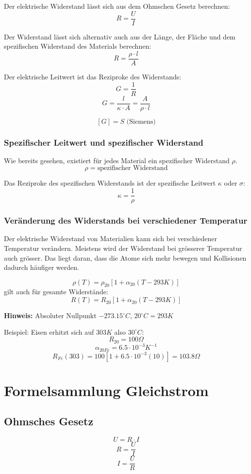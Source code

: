 \documentclass[a4paper,12pt]{article}
\begin{document}
    Der elektrische Widerstand lässt sich aus dem Ohmschen Gesetz berechnen:
    $$R = \frac{U}{I}$$
    
    Der Widerstand lässt sich alternativ auch aus der Länge, der Fläche und dem spezifischen Widerstand des Materials berechnen:
    $$R = \frac{\rho \cdot l}{A}$$
    
    Der elektrische Leitwert ist das Reziproke des Widerstands:
    $$G = \frac{1}{R}$$
    $$G = \frac{l}{\kappa \cdot A} = \frac{A}{\rho \cdot l}$$
    
    $$[G] = S \text{ (Siemens)}$$
    
    \subsubsection{Spezifischer Leitwert und spezifischer Widerstand}
    Wie bereits gesehen, existiert für jedes Material ein spezifischer Widerstand $\rho$.
    $$\rho = \text{spezifischer Widerstand}$$
    
    Das Reziproke des spezifischen Widerstands ist der spezifische Leitwert $\kappa$ oder $\sigma$:
    $$\kappa = \frac{1}{\rho}$$
    
    \subsubsection{Veränderung des Widerstands bei verschiedener Temperatur}
    Der elektrische Widerstand von Materialien kann sich bei verschiedener Temperatur verändern. Meistens wird der Widerstand bei grösserer Temperatur auch grösser. Das liegt daran, dass die Atome sich mehr bewegen und Kollisionen dadurch häufiger werden.
    
    $$\rho(T)=\rho_{20}[1+\alpha_{20}(T-293K)]$$
    gilt auch für gesamte Widerstände:
    $$R(T)=R_{20}[1+\alpha_{20}(T-293K)]$$
    
    \textbf{Hinweis:} Absoluter Nullpunkt $-273.15^\circ C$, $20^\circ C = 293K$
    
    Beispiel:  
    Eisen erhitzt sich auf $303K$ also $30^\circ C$:
    $$R_{20} = 100 \Omega$$
    $$\alpha_{20Fe}=6.5\cdot 10^{-3}K^{-1}$$
    $$R_{Fe}(303)=100[1+6.5\cdot10^{-3}(10)] = 103.8 \Omega$$
    
    \section{Formelsammlung Gleichstrom}
    
    \subsection{Ohmsches Gesetz}
    $$U=R\cdot I$$
    $$R=\frac{U}{I}$$
    $$I=\frac{U}{R}$$
    
\end{document}
